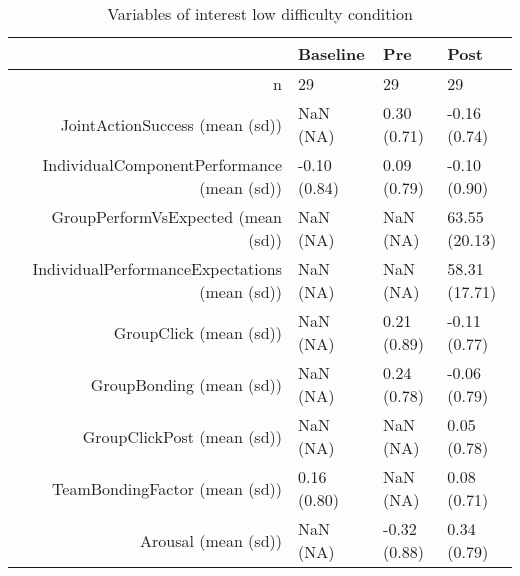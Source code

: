 \begin{table}[ht]
\centering
\begin{tabular}{rlll}
  \hline
 & Baseline & Pre & Post \\ 
  \hline
n &    29 &    29 &    29 \\ 
  JointActionSuccess (mean (sd)) &   NaN (NA) &  0.30 (0.71) & -0.16 (0.74) \\ 
  IndividualComponentPerformance (mean (sd)) & -0.10 (0.84) &  0.09 (0.79) & -0.10 (0.90) \\ 
  GroupPerformVsExpected (mean (sd)) &   NaN (NA) &   NaN (NA) & 63.55 (20.13) \\ 
  IndividualPerformanceExpectations (mean (sd)) &   NaN (NA) &   NaN (NA) & 58.31 (17.71) \\ 
  GroupClick (mean (sd)) &   NaN (NA) &  0.21 (0.89) & -0.11 (0.77) \\ 
  GroupBonding (mean (sd)) &   NaN (NA) &  0.24 (0.78) & -0.06 (0.79) \\ 
  GroupClickPost (mean (sd)) &   NaN (NA) &   NaN (NA) &  0.05 (0.78) \\ 
  TeamBondingFactor (mean (sd)) &  0.16 (0.80) &   NaN (NA) &  0.08 (0.71) \\ 
  Arousal (mean (sd)) &   NaN (NA) & -0.32 (0.88) &  0.34 (0.79) \\ 
   \hline
\end{tabular}
\caption{Variables of interest 
 low difficulty condition} 
\label{tab:factorsTimeLow}
\end{table}
